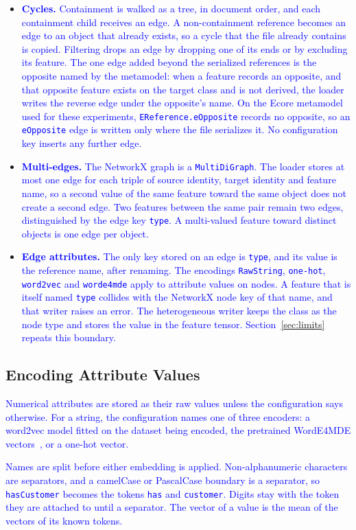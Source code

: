 \documentclass[journal,article,submit,moreauthors,technologies]{Definitions/mdpi}
\newcommand{\rev}[1]{\textcolor{blue}{#1}}
\begin{document}
\begin{itemize}
    \item \rev{\textbf{Cycles.} Containment is walked as a tree, in document order, and each containment child receives an edge. A non-containment reference becomes an edge to an object that already exists, so a cycle that the file already contains is copied. Filtering drops an edge by dropping one of its ends or by excluding its feature. The one edge added beyond the serialized references is the opposite named by the metamodel: when a feature records an opposite, and that opposite feature exists on the target class and is not derived, the loader writes the reverse edge under the opposite's name. On the Ecore metamodel used for these experiments, \texttt{EReference.eOpposite} records no opposite, so an \texttt{eOpposite} edge is written only where the file serializes it. No configuration key inserts any further edge.}
    \item \rev{\textbf{Multi-edges.} The NetworkX graph is a \texttt{MultiDiGraph}. The loader stores at most one edge for each triple of source identity, target identity and feature name, so a second value of the same feature toward the same object does not create a second edge. Two features between the same pair remain two edges, distinguished by the edge key \texttt{type}. A multi-valued feature toward distinct objects is one edge per object.}
    \item \rev{\textbf{Edge attributes.} The only key stored on an edge is \texttt{type}, and its value is the reference name, after renaming. The encodings \texttt{RawString}, \texttt{one-hot}, \texttt{word2vec} and \texttt{worde4mde} apply to attribute values on nodes. A feature that is itself named \texttt{type} collides with the NetworkX node key of that name, and that writer raises an error. The heterogeneous writer keeps the class as the node type and stores the value in the feature tensor. Section~\ref{sec:limits} repeats this boundary.}
\end{itemize}

\subsection{Encoding Attribute Values}\label{sec:avalues}
\rev{Numerical attributes are stored as their raw values unless the configuration says otherwise. For a string, the configuration names one of three encoders: a word2vec model fitted on the dataset being encoded, the pretrained WordE4MDE vectors~\cite{lopez2023word}, or a one-hot vector.}

\rev{Names are split before either embedding is applied. Non-alphanumeric characters are separators, and a camelCase or PascalCase boundary is a separator, so \texttt{hasCustomer} becomes the tokens \texttt{has} and \texttt{customer}. Digits stay with the token they are attached to until a separator. The vector of a value is the mean of the vectors of its known tokens.}
\end{document}
